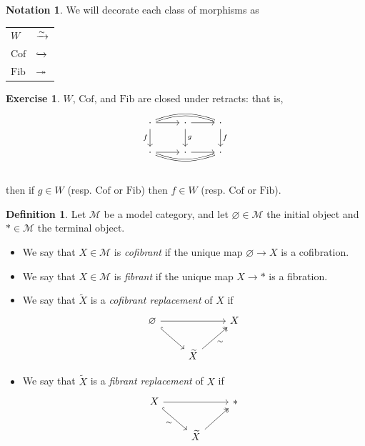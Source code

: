 \documentclass[12pt]{amsart}
\let\til\widetilde
\theoremstyle{definition}
\newtheorem{definition}[theorem]{Definition}
\newtheorem{exercise}[theorem]{Exercise}
\newtheorem{notation}[theorem]{Notation}
\providecommand{\Cof}{\text{Cof}}
\providecommand{\Fib}{\text{Fib}}
\let\emptyset\varnothing
\begin{document}
\begin{notation} We will decorate each class of morphisms as
\begin{center}
\begin{tabular}{l | l}
    $W$ & $\xrightarrow{\sim}$ \\
    $\Cof$ & $\xhookrightarrow{}$ \\
    $\Fib$ & $\twoheadrightarrow$
    \end{tabular}
\end{center}
\end{notation}


\begin{exercise} $W$, $\Cof$, and $\Fib$ are closed under retracts: that is,
\[ \begin{tikzcd}
    \cdot\dar["f" left]\rar\ar[rr,equal,bend left=20] & \cdot\dar["g"]\rar & \cdot\dar["f"]\\
    \cdot\rar\ar[rr,equal,bend right=20] & \cdot\rar & \cdot\\
\end{tikzcd} \]
then if $g\in W$ (resp. $\Cof$ or $\Fib$) then $f\in W$ (resp. $\Cof$ or $\Fib$).
\end{exercise}

\begin{definition} Let $\mathcal{M}$ be a model category, and let $\emptyset \in \mathcal{M}$ the initial object and $\ast\in \mathcal{M}$ the terminal object. 

\begin{itemize}
    \item We say that $X\in \mathcal{M}$ is \textit{cofibrant} if the unique map $\emptyset \to X$ is a cofibration. 
    \item We say that $X\in \mathcal{M}$ is \textit{fibrant} if the unique map $X \to \ast$ is a fibration.
    \item We say that $\til{X}$ is a \textit{cofibrant replacement} of $X$ if
\[ \begin{tikzcd}
    \emptyset\ar[rr]\ar[dr,hook] &  & X\\
     & \til{X}\ar[ur,two heads,"\sim" below right] & 
\end{tikzcd} \]
    \item We say that $\til{X}$ is a \textit{fibrant replacement} of $X$ if
\[ \begin{tikzcd}
    X\ar[rr]\ar[dr,hook,"\sim" below left] &  & \ast\\
     & \til{X}\ar[ur,two heads] & 
\end{tikzcd} \]
\end{itemize}
\end{definition}
\end{document}
